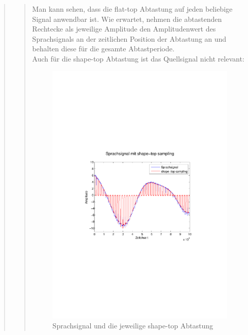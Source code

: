 \begin{quote}
\begin{quote}
            Man kann sehen, dass die flat-top Abtastung auf jeden beliebige Signal
            anwendbar ist. Wie erwartet, nehmen die abtastenden Rechtecke als
            jeweilige Amplitude den Amplitudenwert des Sprachsignals an der
            zeitlichen Position der Abtastung an und behalten diese für die gesamte
            Abtastperiode.\\
            Auch für die shape-top Abtastung ist das Quellsignal nicht relevant:
            
            \begin{figure}[H]
            \centering
            \includegraphics[scale=0.6, trim = 3.5cm 9cm 4cm 9cm,
            clip]{./Bilder/sprache_shape-top}
                \caption{Sprachsignal und die jeweilige shape-top Abtastung}
            \end{figure}
            

\end{quote}
\end{quote}
